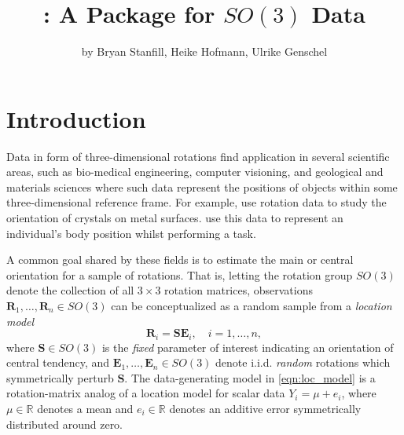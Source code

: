 
\title{: A Package for $SO(3)$ Data}
\author{by Bryan Stanfill, Heike Hofmann, Ulrike Genschel}

\maketitle


\section{Introduction}

Data in form of three-dimensional rotations find application in several scientific areas, such as bio-medical engineering, computer visioning, and geological and materials sciences where such data represent the positions of objects within some three-dimensional reference frame.  For example, \cite{humbert1996, bingham2009, bachmann2010} use rotation data to study the orientation of crystals on metal surfaces.  \cite{rancourt2000} use this data to represent an individual's body position whilst performing a task. 

A common goal shared by these fields is to estimate the main or central orientation for a sample of rotations.  That is, letting the rotation group $SO(3)$ denote the collection of all $3\times 3$ rotation matrices, observations $\bm{R}_1,\ldots,\bm{R}_n \in SO(3)$ can be conceptualized as a random sample from a \textit{location model}
\begin{equation}
\label{eqn:loc_model}
\mathbf{R}_i = \bm{S} \bm{E}_i, \quad i=1,\ldots,n,
\end{equation}
where $\bm S \in SO(3)$ is the {\it fixed} parameter of interest indicating an orientation of central tendency, and $\bm{E}_1,\ldots,\bm{E}_n \in SO(3)$ denote i.i.d. {\it random} rotations which symmetrically perturb $\bm{S}$.  The data-generating model in \eqref{eqn:loc_model} is a rotation-matrix analog of a location model for scalar data $Y_i = \mu + e_i$, where $\mu \in \mathbb{R}$ denotes a mean and $e_i \in \mathbb{R}$ denotes an additive error symmetrically distributed around zero.

